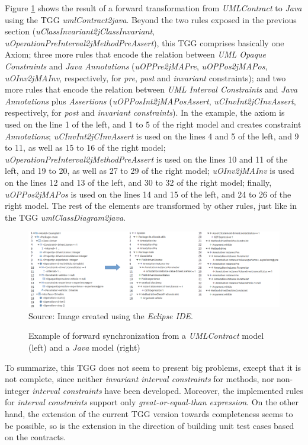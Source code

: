 \documentclass[tuberlin,cic,tc,english,noabntcite,oneside]{iiufrgs}
\begin{document}
Figure \ref{fig:umlContracts2java_Example01} shows the result of a forward transformation from \emph{UMLContract} to \emph{Java} using the TGG \emph{umlContract2java}. Beyond the two rules exposed in the previous section (\emph{uClassInvariant2jClassInvariant}, \emph{uOperationPreInterval2jMethodPreAssert}), this TGG comprises basically one Axiom; three more rules that encode the relation between \emph{UML Opaque Constraints} and \emph{Java Annotations} (\emph{uOPPre2jMAPre},  \emph{uOPPos2jMAPos}, \emph{uOInv2jMAInv}, respectively, for \emph{pre}, \emph{post} and \emph{invariant} constraints); and two more rules that encode the relation between \emph{UML Interval Constraints} and \emph{Java Annotations} plus \emph{Assertions} (\emph{uOPPosInt2jMAPosAssert}, \emph{uCInvInt2jCInvAssert}, respectively, for \emph{post} and \emph{invariant constraints}). In the example, the axiom is used on the line 1 of the left, and 1 to 5 of the right model and creates constraint \emph{Annotations}; \emph{uCInvInt2jCInvAssert} is used on the lines 4 and 5 of the left, and 9 to 11, as well as 15 to 16 of the right model; \emph{uOperationPreInterval2jMethodPreAssert} is used on the lines 10 and 11 of the left, and 19 to 20, as well as 27 to 29 of the right model;  \emph{uOInv2jMAInv} is used on the lines 12 and 13 of the left, and 30 to 32 of the right model; finally, \emph{uOPPos2jMAPos} is used on the lines 14 and 15 of the left, and 24 to 26 of the right model. The rest of the elements are transformed by other rules, just like in the TGG \emph{umlClassDiagram2java}.

\begin{figure}[H]
	\centering
    \caption{Example of forward synchronization from a \emph{UMLContract} model (left) and a \emph{Java} model (right)}
    \includegraphics[width=\textwidth]{umlContracts2java_Example01} \\
    Source: Image created using the \emph{Eclipse IDE}.
    \label{fig:umlContracts2java_Example01}
\end{figure}

To summarize, this TGG does not seem to present big problems, except that it is not complete, since neither \emph{invariant interval constraints} for methods, nor non-integer \emph{interval constraints} have been developed. Moreover, the implemented rules for \emph{interval constraints} support only \emph{great-or-equal-than expression}. On the other hand, the extension of the current TGG version towards completeness seems to be possible, so is the extension in the direction of building unit test cases based on the contracts.
\end{document}
